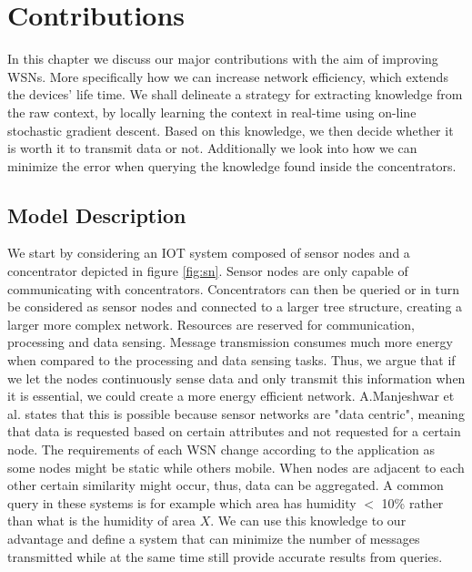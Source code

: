 \documentclass{mproj}
\begin{document}

\chapter{Contributions}
In this chapter we discuss our major contributions with the aim of improving WSNs. More specifically how we can increase network efficiency, which extends the devices' life time. We shall delineate a strategy for extracting knowledge from the raw context, by locally learning the context in real-time using on-line stochastic gradient descent. Based on this knowledge, we then decide whether it is worth it to transmit data or not.
Additionally we look into how we can minimize the error when querying the knowledge found inside the concentrators.

\section{Model Description}
We start by considering an IOT system composed of sensor nodes and a concentrator depicted in figure \ref{fig:sn}. Sensor nodes are only capable of communicating with concentrators. Concentrators can then be queried or in turn be considered as sensor nodes and connected to a larger tree structure, creating a larger more complex network. Resources are reserved for communication, processing and data sensing. Message transmission consumes much more energy when compared to the processing and data sensing tasks. \cite{teen} Thus, we argue that if we let the nodes continuously sense data and only transmit this information when it is essential, we could create a more energy efficient network. A.Manjeshwar et al. \cite{teen} states that this is possible because sensor networks are "data centric", meaning that data is requested based on certain attributes and not requested for a certain node. The requirements of each WSN change according to the application as some nodes might be static while others mobile. When nodes are adjacent to each other certain similarity might occur, thus, data can be aggregated. A common query in these systems is for example which area has humidity $<$ 10\% rather than what is the humidity of area $X$. We can use this knowledge to our advantage and define a system that can minimize the number of messages transmitted while at the same time still provide accurate results from queries.
\end{document}
